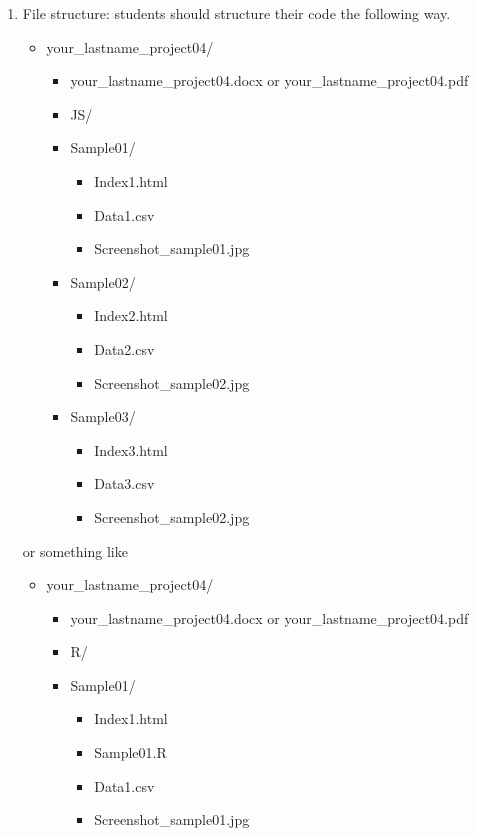 \documentclass{article}
\begin{document}
\begin{enumerate}
    \item File structure:  students should structure their code the following way.
    \begin{itemize}
        \item your\_lastname\_project04/
        \begin{itemize}
            \item your\_lastname\_project04.docx or your\_lastname\_project04.pdf
            \item JS/
            \item Sample01/
            \begin{itemize}
                \item Index1.html
                \item Data1.csv
                \item Screenshot\_sample01.jpg
            \end{itemize}


            \item Sample02/
            \begin{itemize}
                \item Index2.html
                \item Data2.csv
                \item Screenshot\_sample02.jpg
            \end{itemize}

            \item Sample03/
            \begin{itemize}
                \item Index3.html
                \item Data3.csv
                \item Screenshot\_sample02.jpg
            \end{itemize}

        \end{itemize}
    \end{itemize}
    or something like

    \begin{itemize}
        \item your\_lastname\_project04/
        \begin{itemize}
            \item your\_lastname\_project04.docx or your\_lastname\_project04.pdf
            \item R/
            \item Sample01/
            \begin{itemize}
                \item Index1.html
                \item Sample01.R
                \item Data1.csv
                \item Screenshot\_sample01.jpg
            \end{itemize}



\end{itemize}
\end{itemize}
\end{enumerate}
\end{document}
